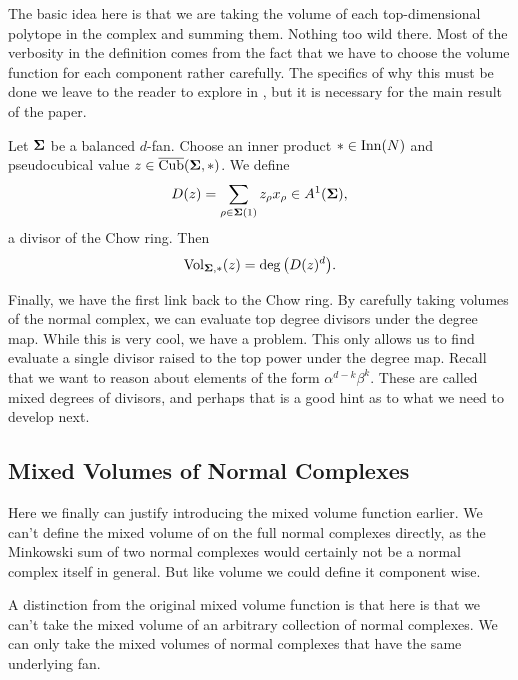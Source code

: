 \documentclass[12pt,oneside]{../../sfsuthesis}
\begin{document}
The basic idea here is that we are taking the volume of each top-dimensional polytope in the complex and summing them.
Nothing too wild there.
Most of the verbosity in the definition comes from the fact that we have to choose the volume function for each component rather carefully.
The specifics of why this must be done we leave to the reader to explore in \cite{nathansonTropicalFansNormal2023}, but it is necessary for the main result of the paper.
\begin{theorem}\th\label{thm:volDegCorrespondence}
    Let \( \bm{\Sigma} \) be a balanced \( d \)-fan.
    Choose an inner product \( \ast \in \operatorname{Inn}(N) \) and pseudocubical value \( z  \in \operatorname{\overline{Cub}}( \bm{\Sigma}, \ast ) \).
    We define
    \[
        D(z) = \sum_{\rho \in \bm{\Sigma}(1)} z_\rho x_\rho \in A^1(\bm{\Sigma}),
    \]
    a divisor of the Chow ring.
    Then
    \[
        \operatorname{Vol}_{\bm{\Sigma}, \ast}(z) = \deg\big( D(z)^d \big).
    \]
\end{theorem}

Finally, we have the first link back to the Chow ring.
By carefully taking volumes of the normal complex, we can evaluate top degree divisors under the degree map.
While this is very cool, we have a problem.
This only allows us to find evaluate a single divisor raised to the top power under the degree map.
Recall that we want to reason about elements of the form \( \alpha^{d-k}\beta^k \).
These are called mixed degrees of divisors, and perhaps that is a good hint as to what we need to develop next.

\subsection{Mixed Volumes of Normal Complexes}
Here we finally can justify introducing the mixed volume function earlier.
We can't define the mixed volume of on the full normal complexes directly, as the Minkowski sum of two normal complexes would certainly not be a normal complex itself in general.
But like volume we could define it component wise.

A distinction from the original mixed volume function is that here is that we can't take the mixed volume of an arbitrary collection of normal complexes.
We can only take the mixed volumes of normal complexes that have the same underlying fan.
\end{document}
